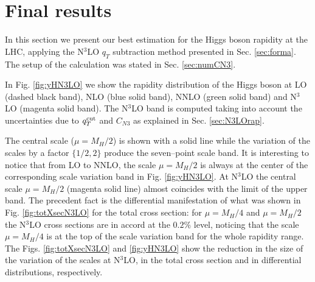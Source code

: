 \documentclass[12pt]{article}
\def\qt{q_T}
\begin{document}
\section{Final results}
\label{sec:results}

In this section we present our best estimation for the Higgs boson rapidity at the LHC, applying the N$^{3}$LO $\qt$ subtraction method presented in Sec.  \ref{sec:forma}. The setup of the calculation was stated in Sec. \ref{sec:numCN3}.

In Fig. \ref{fig:yHN3LO} we show the rapidity distribution of the Higgs boson at LO (dashed black band), NLO (blue solid band), NNLO (green solid band) and N$^{3}$LO (magenta solid band). The N$^{3}$LO band is computed taking into account the uncertainties due to $q_{T}^{\rm cut}$ and $C_{N3}$  as explained in Sec. \ref{sec:N3LOrap}.

The central scale ($\mu=M_{H}/2$) is shown with a solid line while the variation of the scales by a factor $\{1/2,2\}$ produce the seven--point scale band. It is interesting to notice that from LO to NNLO, the scale $\mu=M_{H}/2$ is always at the center of the corresponding scale variation band in Fig. \ref{fig:yHN3LO}.  At N$^{3}$LO the central scale $\mu=M_{H}/2$ (magenta solid line) almost coincides with the limit of the upper band. The precedent fact is the differential manifestation of what was shown in Fig. \ref{fig:totXsecN3LO} for the total cross section:  for $\mu=M_{H}/4$ and $\mu=M_{H}/2$ the N$^{3}$LO cross sections are in accord at the $0.2\%$ level, noticing that the scale $\mu=M_{H}/4$ is at the top of the scale variation band for the whole rapidity range. The Figs. \ref{fig:totXsecN3LO} and \ref{fig:yHN3LO} show the reduction in the size of the variation of the scales at N$^{3}$LO, in the total cross section and in differential distributions, respectively.  
\end{document}

